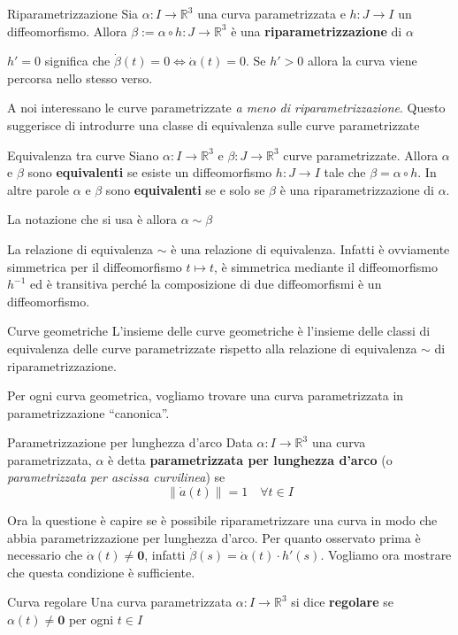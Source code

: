 \begin{definition}{Riparametrizzazione}
    Sia \(\alpha:I \to \mathbb{R}^3\) una curva parametrizzata e \(h : J\to I\)
    un diffeomorfismo. Allora \(\beta := \alpha\circ h : J \to \mathbb{R}^3\) è
    una \textbf{riparametrizzazione} di \(\alpha\) 
\end{definition}
\begin{remark}
    \(h'= 0\) significa che \(\dot{\beta}{(t)} = 0 \iff \dot{\alpha}{(t)}
    =0\). Se \(h'> 0\) allora la curva viene percorsa nello stesso verso.
\end{remark}
A noi interessano le curve parametrizzate \emph{a meno di riparametrizzazione}.
Questo suggerisce di introdurre una classe di equivalenza sulle curve
parametrizzate
\begin{definition}{Equivalenza tra curve}
    Siano \(\alpha : I \to \mathbb{R}^3\) e \(\beta : J \to \mathbb{R}^3\)
    curve parametrizzate. Allora \(\alpha\) e \(\beta\) sono \textbf{equivalenti}
    se esiste un diffeomorfismo \(h : J \to I\) tale che \(\beta = \alpha \circ
    h\). In altre parole \(\alpha\) e \(\beta\) sono \textbf{equivalenti} se e
    solo se \(\beta\) è una riparametrizzazione di \(\alpha\).

    La notazione che si usa è allora \(\alpha \sim \beta\)
\end{definition}
\begin{note}
    La relazione di equivalenza \(\sim\) è una relazione di equivalenza. Infatti
    è ovviamente simmetrica per il diffeomorfismo \(t \mapsto t\), è simmetrica
    mediante il diffeomorfismo \(h^{-1}\) ed è transitiva perché la composizione
    di due diffeomorfismi è un diffeomorfismo.
\end{note}
\begin{definition}{Curve geometriche}
    L'insieme delle curve geometriche è l'insieme delle classi di equivalenza
    delle curve parametrizzate rispetto alla relazione di equivalenza \(\sim\) 
    di riparametrizzazione.
\end{definition}
Per ogni curva geometrica, vogliamo trovare una curva parametrizzata in
parametrizzazione ``canonica''.
\begin{definition}{Parametrizzazione per lunghezza d'arco}
    Data \(\alpha : I \to \mathbb{R}^3\) una curva parametrizzata, \(\alpha\) è
    detta \textbf{parametrizzata per lunghezza d'arco} (o \emph{parametrizzata
    per ascissa curvilinea}) se 
    \[
      \|\dot{a}{(t)}\| = 1 \quad \forall t \in I
    \]
\end{definition}
Ora la questione è capire se è possibile riparametrizzare una curva in modo che
abbia parametrizzazione per lunghezza d'arco. Per quanto osservato prima è
necessario che \(\dot{\alpha}{(t)} \neq \mathbf{0}\), infatti \(\dot{\beta}{(s)} =
\dot{\alpha}{(t)} \cdot h'{(s)}\). Vogliamo ora mostrare che questa condizione è
sufficiente. 
\begin{definition}{Curva regolare}
    Una curva parametrizzata \(\alpha : I \to \mathbb{R}^3\) si dice
    \textbf{regolare} se \(\alpha{(t)} \neq \mathbf{0} \) per ogni \(t \in I\) 
\end{definition}

